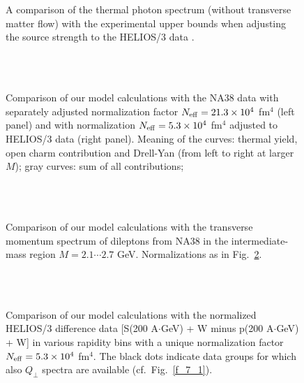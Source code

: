 \begin{figure}[t] %
\centering
~\\[-.1cm]
~\\[.5cm]
\caption{
A comparison of the thermal photon spectrum 
(without transverse matter flow)
with the experimental
upper bounds \cite{WA80} when adjusting the source strength to the 
HELIOS/3 data
\cite{HELIOS-3}.
}
\label{f_9}
\end{figure}

\begin{figure}[t] %
\centering
~\\[-.1cm]
\hfill
{}
~\\[.5cm]
\caption{
Comparison of our model calculations with the NA38 data
\cite{NA38} with separately adjusted normalization factor
$N_{\rm eff} = 21.3 \times 10^4$ fm${}^4$ (left panel)
and with normalization 
$N_{\rm eff} =  5.3 \times 10^4$ fm${}^4$
adjusted to HELIOS/3 data \cite{HELIOS-3} (right panel).
Meaning of the curves: thermal yield, open charm contribution and Drell-Yan
(from left to right at larger $M$);
gray curves: sum of all contributions;
}
\label{f_6}
\end{figure}

\begin{figure}[t] %
\centering
~\\[-.1cm]
\hfill
{}
~\\[.5cm]
\caption{
Comparison of our model calculations with the transverse momentum spectrum of
dileptons from NA38 \cite{NA38} in the intermediate-mass region
$M = 2.1 \cdots 2.7$ GeV.
Normalizations as in Fig.~\protect\ref{f_6}.
}
\label{f_8}
\end{figure}

\begin{figure}[t] %
\centering
~\\[-.1cm]
\hfill
{}
\hfill
{}
~\\[.5cm]
\caption{
Comparison of our model calculations with the normalized 
HELIOS/3 difference data
[S(200 A$\cdot$GeV) + W minus p(200 A$\cdot$GeV) + W]
in various rapidity bins
\cite{HELIOS-3} with a unique normalization factor
$N_{\rm eff} = 5.3 \times 10^4$ fm${}^4$.
The black dots indicate data groups for which also $Q_\perp$ spectra
are available (cf.\ Fig.~\protect\ref{f_7_1}).
}
\label{f_7}
\end{figure}

